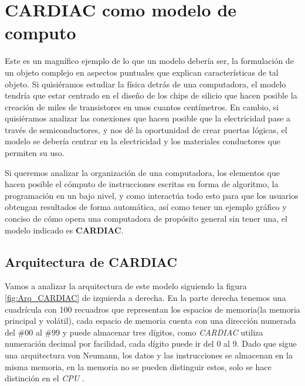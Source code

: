 \documentclass[letterpaper,12pt,oneside]{book}
\begin{document}
	\clearpage			
	
	\section{CARDIAC como modelo de computo}
	
	Este es un magnífico ejemplo de lo que un modelo debería ser, la formulación de un objeto complejo en aspectos puntuales que explican características de tal objeto.
 Si quisiéramos estudiar la física detrás de una computadora, el modelo tendría que estar centrado
	en el diseño de los chips de silicio que hacen posible la creación de miles de transistores en unos cuantos centímetros. En cambio, si quisiéramos 
	analizar las conexiones que hacen posible que la electricidad pase a través de semiconductores, y nos dé la oportunidad de crear puertas lógicas,
	el modelo se debería centrar en la electricidad y los materiales conductores que permiten su uso.
 
    Si queremos analizar la organización
	de una computadora, los elementos que hacen posible el cómputo de instrucciones escritas en forma de algoritmo, la programación
	en un bajo nivel, y como interactúa todo esto para que los usuarios obtengan resultados de forma automática, así como tener un ejemplo gráfico y 	
	conciso de cómo opera una computadora
	de propósito general sin tener una, el modelo indicado es \textbf{CARDIAC}.
	
	\subsection{Arquitectura de CARDIAC}	
	
	Vamos a analizar la arquitectura de este modelo siguiendo la figura \ref{fig:Arq_CARDIAC} de izquierda a derecha. En la parte
	derecha tenemos una cuadrícula con 100 recuadros que representan los espacios de memoria(la memoria principal y volátil),
	cada espacio de memoria cuenta con una dirección numerada del \#00 al \#99 y puede almacenar tres dígitos, como \textit{CARDIAC} utiliza
	numeración decimal por facilidad, cada dígito puede ir del 0 al 9. Dado que sigue una arquitectura von Neumann, los datos
	y las instrucciones se almacenan en la misma memoria, en la memoria no se pueden distinguir estos, solo se hace distinción en
	el \textit{CPU} \cite{fingerman_instruction_1968}.
	
\end{document}
